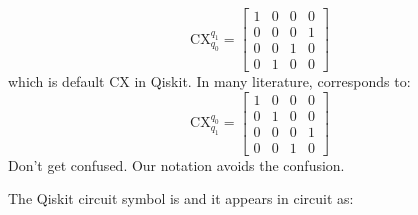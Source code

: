 \documentclass[letterpaper,10pt,english]{jupyterBook}
\begin{document}
\sphinxAtStartPar
{}
\begin{equation*}
\text{CX}_{q_0}^{q_1} = \begin{bmatrix} 1&0&0&0\\0&0&0&1\\0&0&1&0\\0&1&0&0\end{bmatrix}
\end{equation*}
\sphinxAtStartPar
which is default CX in Qiskit.  In many literature,  corresponds to:
\begin{equation*}
\text{CX}_{q_1}^{q_0} = \begin{bmatrix} 1&0&0&0\\0&1&0&0\\0&0&0&1\\0&0&1&0\end{bmatrix}
\end{equation*}
\sphinxAtStartPar
Don’t get confused. Our notation avoids the confusion.

\sphinxAtStartPar
The Qiskit circuit symbol is  and it appears in circuit as:
\end{document}
